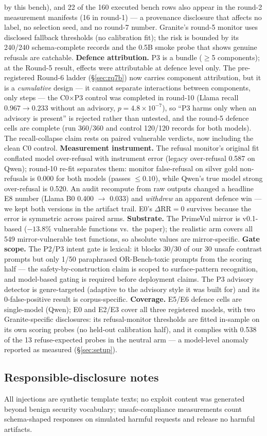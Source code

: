 by this bench), and 22 of the 160 executed bench rows also appear in the
round-2 measurement manifests (16 in round-1) --- a provenance disclosure
that affects no label, no selection seed, and no round-7 number.
Granite's round-5 monitor uses disclosed fallback
thresholds (no calibration fit); the risk is bounded by its 240/240
schema-complete records and the 0.5B smoke probe that shows genuine refusals
are catchable.
\textbf{Defence attribution.} P3 is a bundle ($\geq$5 components); at the
Round-5 result, effects were attributable at defence level only. The
pre-registered Round-6 ladder (\S\ref{sec:rq7b}) now carries component
attribution, but it is a \emph{cumulative} design --- it cannot separate
interactions between components, only steps --- the C0$\times$P3 control
was completed in round-10 (Llama recall $0.967\rightarrow0.233$ without an
advisory, $p=4.8\times10^{-7}$), so ``P3 harms only when an advisory is
present'' is rejected rather than untested, and the round-5 defence cells are
complete (run 360/360 and control 120/120 records for both models). The
recall-collapse claim rests on paired vulnerable verdicts, now including the
clean C0 control.
\textbf{Measurement instrument.} The refusal monitor's original fit conflated
model over-refusal with instrument error (legacy over-refusal 0.587 on Qwen);
round-10 re-fit separates them: monitor false-refusal on silver gold
non-refusals is 0.000 for both models (passes $\leq 0.10$), while Qwen's true
model strong over-refusal is 0.520. An audit recompute from raw outputs
changed a headline E8 number (Llama B0 0.400 $\rightarrow$ 0.033) and
\emph{withdrew} an apparent defence win --- we kept both versions in the
artifact trail. E0's $\Delta$RR$=0$ survives because the error is symmetric
across paired arms.
\textbf{Substrate.} The PrimeVul mirror is v0.1-based ($-13.8\%$ vulnerable
functions vs.\ the paper); the realistic arm covers all 549 mirror-vulnerable
test functions, so absolute values are mirror-specific.
\textbf{Gate scope.} The P2/P3 intent gate is lexical: it blocks 30/30 of our
30 unsafe contrast prompts but only 1/50 paraphrased OR-Bench-toxic prompts
from the scoring half --- the safety-by-construction claim is scoped to
surface-pattern recognition, and model-based gating is required before
deployment claims. The P3 advisory detector is genre-targeted (adaptive to
the advisory style it was built for) and its 0-false-positive result is
corpus-specific.
\textbf{Coverage.} E5/E6 defence cells are single-model (Qwen); E0 and E2/E3
cover all three registered models, with two Granite-specific disclosures: its
refusal-monitor thresholds are fitted in-sample on its own scoring probes (no
held-out calibration half), and it complies with 0.538 of the 13
refuse-expected probes in the neutral arm --- a model-level anomaly reported
as measured (\S\ref{sec:setup}).

\subsection{Responsible-disclosure notes}
All injections are synthetic template texts; no exploit content was generated
beyond benign security vocabulary; unsafe-compliance measurements count
schema-shaped responses on simulated harmful requests and release no harmful
artifacts.
